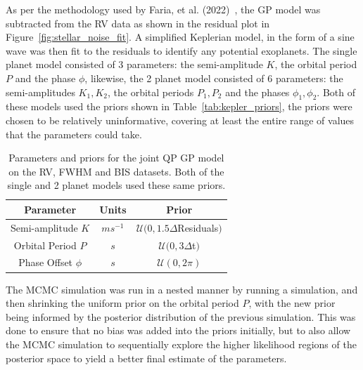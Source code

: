 As per the methodology used by Faria, et al. (2022)~\cite{faria2022}, the GP model was subtracted from the RV data as shown
in the residual plot in Figure~\eqref{fig:stellar_noise_fit}.
A simplified Keplerian model, in the form of a sine wave was then fit to the residuals to identify any potential exoplanets.
The single planet model consisted of 3 parameters: the semi-amplitude $K$, the orbital period $P$ and the phase $\phi$,
likewise, the 2 planet model consisted of 6 parameters: the semi-amplitudes $K_{1}, K_{2}$, the orbital periods $P_{1}, P_{2}$
and the phases $\phi_{1}, \phi_{2}$.
Both of these models used the priors shown in Table~\eqref{tab:kepler_priors}, the priors were chosen to be relatively
uninformative, covering at least the entire range of values that the parameters could take.

\begin{table}[htb]
    \centering
    \begin{tabular}{ccc}
        \toprule
        \toprule
        Parameter & Units & Prior \\
        \midrule
        Semi-amplitude $K$ & $ms^{-1}$ & $\mathcal{U}(0, 1.5 \Delta$Residuals$)$ \\
        \addlinespace
        Orbital Period $P$ & $s$ & $\mathcal{U}(0, 3 \Delta$t$)$  \\
        \addlinespace
        Phase Offset $\phi$ & $s$ & $\mathcal{U}(0, 2\pi)$ \\
        \bottomrule
    \end{tabular}
    \caption{Parameters and priors for the joint QP GP model on the RV, FWHM and BIS datasets.
    Both of the single and 2 planet models used these same priors.}
    \label{tab:kepler_priors}
\end{table}

The MCMC simulation was run in a nested manner by running a simulation, and then shrinking the uniform prior on the orbital
period $P$, with the new prior being informed by the posterior distribution of the previous simulation.
This was done to ensure that no bias was added into the priors initially, but to also allow the MCMC simulation to sequentially
explore the higher likelihood regions of the posterior space to yield a better final estimate of the parameters.

